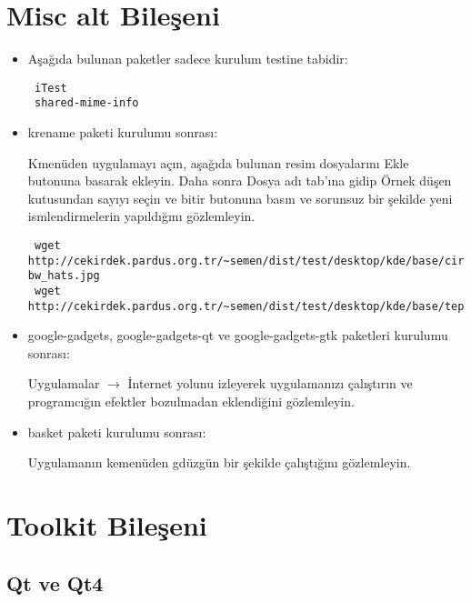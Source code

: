 \documentclass[a4paper,10pt]{article}
\begin{document}
\section{Misc alt Bileşeni}
\begin{itemize}
\item Aşağıda bulunan paketler sadece kurulum testine tabidir:
\begin{verbatim}
 iTest
 shared-mime-info
\end{verbatim}

\item krename paketi kurulumu sonrası:

Kmenüden uygulamayı açın, aşağıda bulunan resim dosyalarını Ekle butonuna basarak ekleyin. Daha sonra Dosya adı tab'ına gidip Örnek düşen kutusundan sayıyı seçin ve bitir butonuna basın ve sorunsuz bir şekilde yeni ismlendirmelerin yapıldığını gözlemleyin.
\begin{verbatim}
 wget http://cekirdek.pardus.org.tr/~semen/dist/test/desktop/kde/base/circus-bw_hats.jpg
 wget http://cekirdek.pardus.org.tr/~semen/dist/test/desktop/kde/base/tepecik_01.png
\end{verbatim}

\item google-gadgets, google-gadgets-qt ve google-gadgets-gtk paketleri kurulumu sonrası:

Uygulamalar $\rightarrow$ İnternet yolunu izleyerek uygulamanızı çalıştırın ve programcığın efektler bozulmadan eklendiğini gözlemleyin.

\item basket paketi kurulumu sonrası:

Uygulamanın kemenüden gdüzgün bir şekilde çalıştığını gözlemleyin.

\end{itemize}

\section{Toolkit Bileşeni}
\subsection*{Qt ve Qt4}
\end{document}

